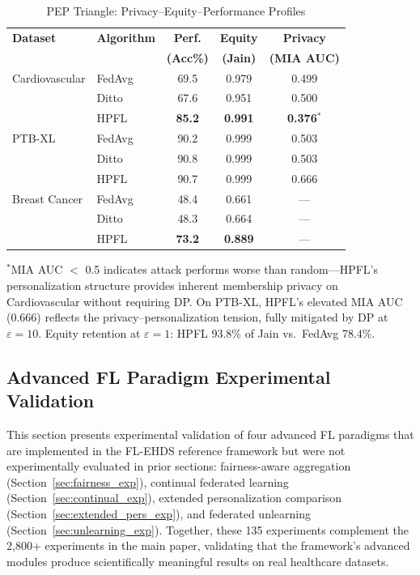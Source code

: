 \documentclass[conference]{IEEEtran}
\begin{document}
\begin{table}[htbp]
\centering
\caption{PEP Triangle: Privacy--Equity--Performance Profiles}
\label{tab:pep_triangle}
\small
\begin{tabular}{llccc}
\toprule
\textbf{Dataset} & \textbf{Algorithm} & \textbf{Perf.} & \textbf{Equity} & \textbf{Privacy} \\
 & & \textbf{(Acc\%)} & \textbf{(Jain)} & \textbf{(MIA AUC)} \\
\midrule
Cardiovascular & FedAvg & 69.5 & 0.979 & 0.499 \\
 & Ditto & 67.6 & 0.951 & 0.500 \\
 & HPFL & \textbf{85.2} & \textbf{0.991} & \textbf{0.376}$^*$ \\
\midrule
PTB-XL & FedAvg & 90.2 & 0.999 & 0.503 \\
 & Ditto & 90.8 & 0.999 & 0.503 \\
 & HPFL & 90.7 & 0.999 & 0.666 \\
\midrule
Breast Cancer & FedAvg & 48.4 & 0.661 & --- \\
 & Ditto & 48.3 & 0.664 & --- \\
 & HPFL & \textbf{73.2} & \textbf{0.889} & --- \\
\bottomrule
\end{tabular}

\vspace{1mm}
\footnotesize{$^*$MIA AUC $<$ 0.5 indicates attack performs worse than random---HPFL's personalization structure provides inherent membership privacy on Cardiovascular without requiring DP. On PTB-XL, HPFL's elevated MIA AUC (0.666) reflects the privacy--personalization tension, fully mitigated by DP at $\varepsilon{=}10$. Equity retention at $\varepsilon{=}1$: HPFL 93.8\% of Jain vs.\ FedAvg 78.4\%.}
\end{table}



\subsection{Advanced FL Paradigm Experimental Validation}
\label{sec:cascade4}

This section presents experimental validation of four advanced FL paradigms that are implemented in the FL-EHDS reference framework but were not experimentally evaluated in prior sections: fairness-aware aggregation (Section~\ref{sec:fairness_exp}), continual federated learning (Section~\ref{sec:continual_exp}), extended personalization comparison (Section~\ref{sec:extended_pers_exp}), and federated unlearning (Section~\ref{sec:unlearning_exp}). Together, these 135 experiments complement the 2,800+ experiments in the main paper, validating that the framework's advanced modules produce scientifically meaningful results on real healthcare datasets.
\end{document}
